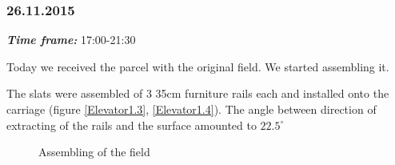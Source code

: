 \subsubsection{26.11.2015}
\textit{\textbf{Time frame:}} 17:00-21:30

Today we received the parcel with the original field. We started assembling it.

The slats were assembled of 3 35cm furniture rails each and installed onto the carriage (figure \ref{Elevator1.3}, \ref{Elevator1.4}). The angle between direction of extracting of the rails and the surface amounted to $22.5^\circ$

\begin{figure}[H]
	\begin{minipage}[h]{0.31\linewidth}
		\caption{Assembling of the field}
	\end{minipage}
	\hfill
	\begin{minipage}[h]{0.31\linewidth}

\end{minipage}
\end{figure}
